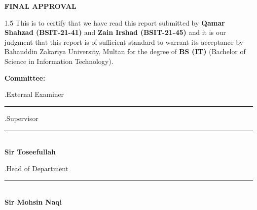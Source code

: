 
\begin{center}
{\sffamily\bfseries\fontsize{16}{20}\selectfont FINAL APPROVAL\par}
\end{center}

\vspace{1.2cm}

\begin{spacing}{1.5}
\justifying
\noindent
This is to certify that we have read this report submitted by \textbf{Qamar Shahzad (BSIT-21-41)} and \textbf{Zain Irshad (BSIT-21-45)} and it is our judgment that this report is of sufficient standard to warrant its acceptance by Bahauddin Zakariya University, Multan for the degree of \textbf{BS (IT)} (Bachelor of Science in Information Technology).
\end{spacing}

\vspace{1.5cm}

\noindent
\textbf{\large Committee:}

\vspace{1.5cm}

.\quad External Examiner \hfill \rule{6cm}{0.4pt}

\vspace{1.8cm}

.\quad Supervisor \hfill \rule{6cm}{0.4pt} \\[0.1cm]
\hspace*{1.2cm}\textbf{Sir Toseefullah}

\vspace{1.8cm}

.\quad Head of Department \hfill \rule{6cm}{0.4pt} \\[0.1cm]
\hspace*{1.2cm}\textbf{Sir Mohsin Naqi}
